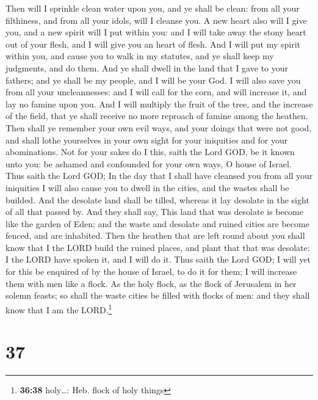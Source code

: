 Then will I sprinkle clean water upon you, and ye shall
be clean: from all your filthiness, and from all your idols, will I
cleanse you.  A new heart also will I give you, and a new
spirit will I put within you: and I will take away the stony heart out
of your flesh, and I will give you an heart of flesh. 
And I will put my spirit within you, and cause you to walk in my
statutes, and ye shall keep my judgments, and do them. 
And ye shall dwell in the land that I gave to your fathers; and ye shall
be my people, and I will be your God.  I will also save
you from all your uncleannesses: and I will call for the corn, and will
increase it, and lay no famine upon you.  And I will
multiply the fruit of the tree, and the increase of the field, that ye
shall receive no more reproach of famine among the heathen.
 Then shall ye remember your own evil ways, and your
doings that were not good, and shall lothe yourselves in your own sight
for your iniquities and for your abominations.  Not for
your sakes do I this, saith the Lord GOD, be it known unto you: be
ashamed and confounded for your own ways, O house of Israel.
 Thus saith the Lord GOD; In the day that I shall have
cleansed you from all your iniquities I will also cause you to dwell in
the cities, and the wastes shall be builded.  And the
desolate land shall be tilled, whereas it lay desolate in the sight of
all that passed by.  And they shall say, This land that
was desolate is become like the garden of Eden; and the waste and
desolate and ruined cities are become fenced, and are inhabited.
 Then the heathen that are left round about you shall
know that I the LORD build the ruined places, and plant that that was
desolate: I the LORD have spoken it, and I will do it. 
Thus saith the Lord GOD; I will yet for this be enquired of by the house
of Israel, to do it for them; I will increase them with men like a
flock.  As the holy flock, as the flock of Jerusalem in
her solemn feasts; so shall the waste cities be filled with flocks of
men: and they shall know that I am the LORD.\footnote{\textbf{36:38}
  holy\ldots: Heb. flock of holy things}

\hypertarget{section-36}{%
\section{37}\label{section-36}}

